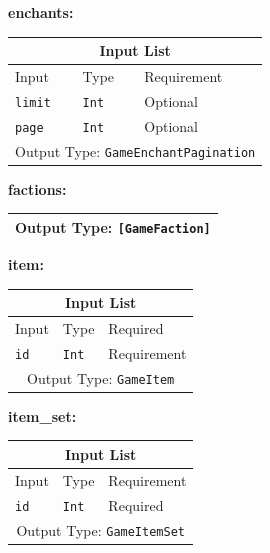 \documentclass[10pt, a4paper]{memoir}
\numberwithin{equation}{section}
\theoremstyle{plain}
\theoremstyle{defp}
\theoremstyle{dotless}
\theoremstyle{definition}
\theoremstyle{dotless}
\theoremstyle{dotless}
\theoremstyle{defp}
\theoremstyle{defp}
\theoremstyle{be}          %
\theoremstyle{defp}
\newcommand\ttt[1]{\texttt{#1}}
\begin{document}
\textbf{enchants:}

\begin{table}[h!]
	\centering
	\begin{tabular}{ |p{4.2cm}|p{6cm}|p{3cm}|  }
		\hline
		\multicolumn{3}{|c|}{Input List} \\
		\hline
		Input & Type & Requirement\\
		\hline
		\ttt{limit} & \ttt{Int} & Optional\\
		\ttt{page} & \ttt{Int} & Optional\\
		\hline
		\multicolumn{3}{|c|}{Output Type: \ttt{GameEnchantPagination}} \\
		\hline
	\end{tabular}
\end{table}

\medskip

\textbf{factions:}

\begin{table}[h!]
	\centering
	\begin{tabular}{ |p{4.2cm}|p{6cm}|p{3cm}|  }
		\hline
		\multicolumn{3}{|c|}{Output Type: \ttt{[GameFaction]}} \\
		\hline
	\end{tabular}
\end{table}

\medskip

\textbf{item:}

\begin{table}[h!]
	\centering
	\begin{tabular}{ |p{4.2cm}|p{6cm}|p{3cm}|  }
		\hline
		\multicolumn{3}{|c|}{Input List} \\
		\hline
		Input & Type & Required\\
		\hline
		\ttt{id} & \ttt{Int} & Requirement\\
		\hline
		\multicolumn{3}{|c|}{Output Type: \ttt{GameItem}} \\
		\hline
	\end{tabular}
\end{table}

\medskip

\textbf{item\_set:}

\begin{table}[h!]
	\centering
	\begin{tabular}{ |p{4.2cm}|p{6cm}|p{3cm}|  }
		\hline
		\multicolumn{3}{|c|}{Input List} \\
		\hline
		Input & Type & Requirement\\
		\hline
		\ttt{id} & \ttt{Int} & Required\\
		\hline
		\multicolumn{3}{|c|}{Output Type: \ttt{GameItemSet}} \\
		\hline
	\end{tabular}
\end{table}
\end{document}
